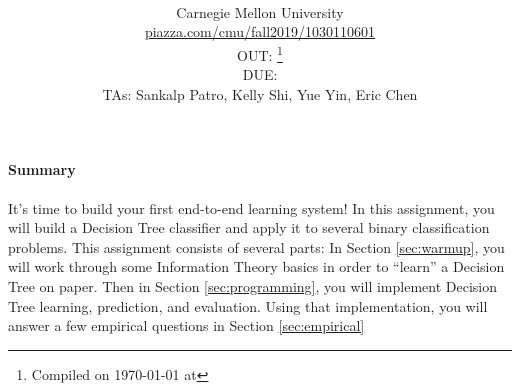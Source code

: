 \documentclass[11pt]{article}
\title{\textsc{\hwName}} %
\author{\courseName\\
  Carnegie Mellon University \\
\url{piazza.com/cmu/fall2019/1030110601} \\
OUT: \outDate{}\thanks{Compiled on \today{} at \currenttime{}} \\
DUE: \dueDate{} \\ 
TAs: Sankalp Patro, Kelly Shi, Yue Yin, Eric Chen}
\date{}
\date{}
\numberwithin{equation}{section} %
\numberwithin{figure}{section} %
\numberwithin{table}{section} %
\begin{document}
\maketitle

\begin{notebox}
\paragraph{Summary} It's time to build your first end-to-end learning system! In this assignment, you will build a Decision Tree classifier and apply it to several binary classification problems. This assignment consists of several parts: In Section \ref{sec:warmup}, you will work through some Information Theory basics in order to ``learn'' a Decision Tree on paper. Then in Section \ref{sec:programming}, you will implement Decision Tree learning, prediction, and evaluation. Using that implementation, you will answer a few empirical questions in Section \ref{sec:empirical}
\end{notebox}
\end{document}
